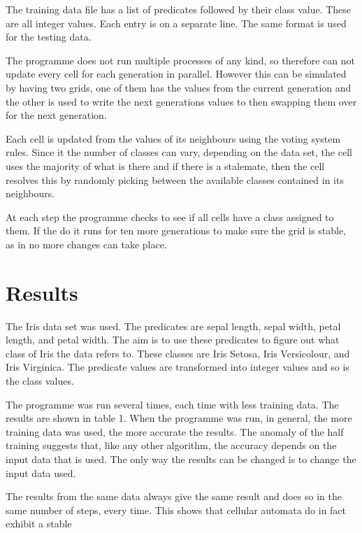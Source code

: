 \documentclass[11pt]{article}
\begin{document}
The training data file has a list of predicates followed by their
class value.  These are all integer values.  Each entry is on a
separate line.  The same format is used for the testing data.

The programme does not run multiple processes of any kind, so
therefore can not update every cell for each generation in parallel.
However this can be simulated by having two grids, one of them has the
values from the current generation and the other is used to write the
next generations values to then swapping them over for the next
generation.

Each cell is updated from the values of its neighbours
using the voting system rules.  Since it the number of classes can
vary, depending on the data set, the cell uses the majority of what is
there and if there is a stalemate, then the cell resolves this by
randomly  picking between the available classes contained in its
neighbours. 

At each step the programme checks to see if all cells have
a class assigned to them.  If the do it runs for ten more generations
to make sure the grid is stable, as in no more changes can take place.
\section{Results}
\label{sec-5}


  The Iris data set was used.  The predicates are sepal length,
  sepal width, petal length, and petal width.  The aim is to use these
  predicates to figure out what class of Iris the data refers to.  These
  classes are  Iris Setosa, Iris Versicolour, and Iris Virginica.  The
  predicate values are transformed into integer values and so is the
  class values.

  The programme was run several times, each time with less training
  data. The results are shown in table 1. When the programme was run, in
  general, the more training data was used, the more accurate the
  results.  The anomaly of the half training suggests that, like any
  other algorithm, the accuracy depends on the input data that is
  used. The only way the results can be changed is to change the input
  data used.

  The results from the same data always give the same result and does so
  in the same number of steps, every time.  This shows that cellular
  automata do in fact exhibit a stable 
\end{document}
